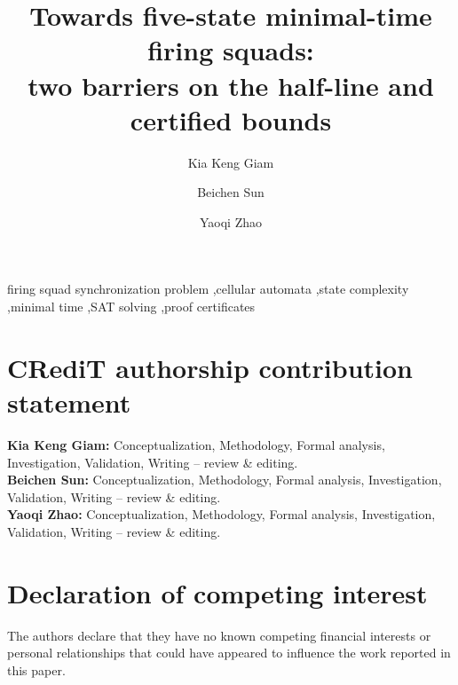 \documentclass[preprint,11pt]{elsarticle}
\theoremstyle{definition}
\theoremstyle{remark}
\begin{document}
\begin{frontmatter}

\title{Towards five-state minimal-time firing squads:\\
two barriers on the half-line and certified bounds}

\author[tjc]{Kia Keng Giam}
\author[hci]{Beichen Sun}
\author[hci]{Yaoqi Zhao}


\begin{abstract}

\end{abstract}

\begin{keyword}
firing squad synchronization problem \sep cellular automata \sep state
complexity \sep minimal time \sep SAT solving \sep proof certificates
\end{keyword}

\end{frontmatter}

\clearpage

\clearpage







\section*{CRediT authorship contribution statement}
\noindent\textbf{Kia Keng Giam:} Conceptualization, Methodology, Formal
analysis, Investigation, Validation, Writing -- review \& editing.\\
\textbf{Beichen Sun:} Conceptualization, Methodology, Formal analysis,
Investigation, Validation, Writing -- review \& editing.\\
\textbf{Yaoqi Zhao:} Conceptualization, Methodology, Formal analysis,
Investigation, Validation, Writing -- review \& editing.

\section*{Declaration of competing interest}
The authors declare that they have no known competing financial interests
or personal relationships that could have appeared to influence the work
reported in this paper.
\end{document}
